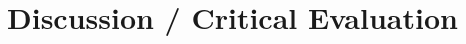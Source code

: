 \documentclass[12pt]{article}
\begin{document}
\section{Discussion / Critical Evaluation}

\noindent




\end{document}
